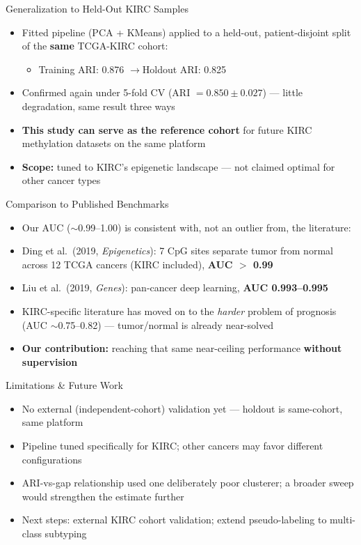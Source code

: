 \documentclass[aspectratio=169]{beamer}
\begin{document}
\begin{frame}{Generalization to Held-Out KIRC Samples}
  \begin{itemize}
    \item Fitted pipeline (PCA + KMeans) applied to a held-out, patient-disjoint split of the \textbf{same} TCGA-KIRC cohort:
    \begin{itemize}
      \item Training ARI: 0.876 \quad$\rightarrow$\quad Holdout ARI: 0.825
    \end{itemize}
    \item Confirmed again under 5-fold CV (ARI $=0.850\pm0.027$) --- little degradation, same result three ways
    \item \textbf{This study can serve as the reference cohort} for future KIRC methylation datasets on the same platform
    \item \textbf{Scope:} tuned to KIRC's epigenetic landscape --- not claimed optimal for other cancer types
  \end{itemize}
\end{frame}

\begin{frame}{Comparison to Published Benchmarks}
  \begin{itemize}
    \item Our AUC ($\sim$0.99--1.00) is consistent with, not an outlier from, the literature:
    \item Ding et al.\ (2019, \emph{Epigenetics}): 7 CpG sites separate tumor from normal across 12 TCGA cancers (KIRC included), \textbf{AUC $>$ 0.99}
    \item Liu et al.\ (2019, \emph{Genes}): pan-cancer deep learning, \textbf{AUC 0.993--0.995}
    \item KIRC-specific literature has moved on to the \emph{harder} problem of prognosis (AUC $\sim$0.75--0.82) --- tumor/normal is already near-solved
    \item \textbf{Our contribution:} reaching that same near-ceiling performance \textbf{without supervision}
  \end{itemize}
\end{frame}

\begin{frame}{Limitations \& Future Work}
  \begin{itemize}
    \item No external (independent-cohort) validation yet --- holdout is same-cohort, same platform
    \item Pipeline tuned specifically for KIRC; other cancers may favor different configurations
    \item ARI-vs-gap relationship used one deliberately poor clusterer; a broader sweep would strengthen the estimate further
    \item Next steps: external KIRC cohort validation; extend pseudo-labeling to multi-class subtyping
  \end{itemize}
\end{frame}
\end{document}
